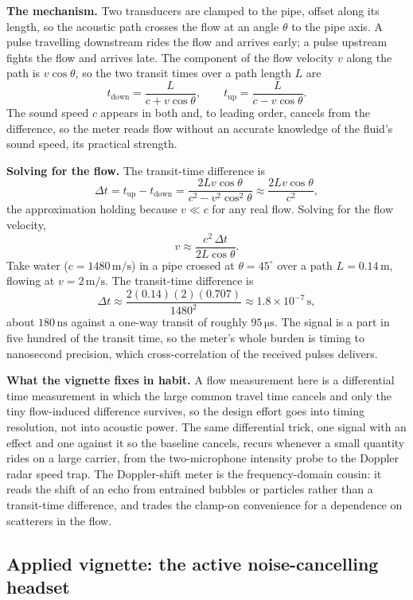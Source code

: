 \textbf{The mechanism.} Two transducers are clamped to the pipe, offset
along its length, so the acoustic path crosses the flow at an angle
$\theta$ to the pipe axis. A pulse travelling downstream rides the flow and
arrives early; a pulse upstream fights the flow and arrives late. The
component of the flow velocity $v$ along the path is $v\cos\theta$, so the
two transit times over a path length $L$ are
\[
t_{\text{down}} = \frac{L}{c + v\cos\theta},
\qquad
t_{\text{up}} = \frac{L}{c - v\cos\theta}.
\]
The sound speed $c$ appears in both and, to leading order, cancels from the
difference, so the meter reads flow without an accurate knowledge of the
fluid's sound speed, its practical strength.

\textbf{Solving for the flow.} The transit-time difference is
\[
\Delta t = t_{\text{up}} - t_{\text{down}}
        = \frac{2 L v\cos\theta}{c^2 - v^2\cos^2\theta}
        \approx \frac{2 L v\cos\theta}{c^2},
\]
the approximation holding because $v\ll c$ for any real flow. Solving for the
flow velocity,
\[
v \approx \frac{c^2\,\Delta t}{2 L\cos\theta}.
\]
Take water ($c=1480\,\si{\meter\per\second}$) in a pipe crossed at
$\theta=45^{\circ}$ over a path $L=0.14\,\si{\meter}$, flowing at
$v=2\,\si{\meter\per\second}$. The transit-time difference is
\[
\Delta t \approx \frac{2(0.14)(2)(0.707)}{1480^2}
        \approx 1.8\times 10^{-7}\,\si{\second},
\]
about $180\,\si{\nano\second}$ against a one-way transit of roughly
$95\,\si{\micro\second}$. The signal is a part in five hundred of the
transit time, so the meter's whole burden is timing to nanosecond precision,
which cross-correlation of the received pulses delivers.

\textbf{What the vignette fixes in habit.} A flow measurement here is a
differential time measurement in which the large common travel time cancels
and only the tiny flow-induced difference survives, so the design effort goes
into timing resolution, not into acoustic power. The same differential trick,
one signal with an effect and one against it so the baseline cancels, recurs
whenever a small quantity rides on a large carrier, from the two-microphone
intensity probe to the Doppler radar speed trap. The Doppler-shift meter is
the frequency-domain cousin: it reads the shift of an echo from entrained
bubbles or particles rather than a transit-time difference, and trades the
clamp-on convenience for a dependence on scatterers in the flow.

\subsection{Applied vignette: the active noise-cancelling headset}

